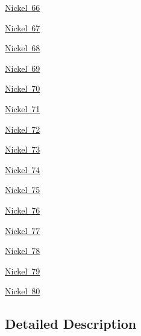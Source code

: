 \begin{DoxyCompactItemize}
\mbox{\hyperlink{group___isotope_const-_nickel-_ni66}{Nickel 66}}
\item 
\mbox{\hyperlink{group___isotope_const-_nickel-_ni67}{Nickel 67}}
\item 
\mbox{\hyperlink{group___isotope_const-_nickel-_ni68}{Nickel 68}}
\item 
\mbox{\hyperlink{group___isotope_const-_nickel-_ni69}{Nickel 69}}
\item 
\mbox{\hyperlink{group___isotope_const-_nickel-_ni70}{Nickel 70}}
\item 
\mbox{\hyperlink{group___isotope_const-_nickel-_ni71}{Nickel 71}}
\item 
\mbox{\hyperlink{group___isotope_const-_nickel-_ni72}{Nickel 72}}
\item 
\mbox{\hyperlink{group___isotope_const-_nickel-_ni73}{Nickel 73}}
\item 
\mbox{\hyperlink{group___isotope_const-_nickel-_ni74}{Nickel 74}}
\item 
\mbox{\hyperlink{group___isotope_const-_nickel-_ni75}{Nickel 75}}
\item 
\mbox{\hyperlink{group___isotope_const-_nickel-_ni76}{Nickel 76}}
\item 
\mbox{\hyperlink{group___isotope_const-_nickel-_ni77}{Nickel 77}}
\item 
\mbox{\hyperlink{group___isotope_const-_nickel-_ni78}{Nickel 78}}
\item 
\mbox{\hyperlink{group___isotope_const-_nickel-_ni79}{Nickel 79}}
\item 
\mbox{\hyperlink{group___isotope_const-_nickel-_ni80}{Nickel 80}}
\end{DoxyCompactItemize}


\subsection{Detailed Description}
